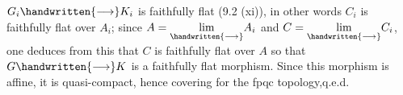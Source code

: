 
$G_i\handwritten{\longrightarrow}K_i$ is faithfully flat (9.2 (xi)), in other words $C_i$ is faithfully flat over $A_i$; since $A=\underset{\handwritten{\longrightarrow}}{\lim}A_i$ and $C=\underset{\handwritten{\longrightarrow}}{\lim}C_i$, one deduces from this that $C$ is faithfully flat over $A$\handwritten{,} so that $G\handwritten{\longrightarrow}K$ is a faithfully flat morphism. Since this morphism is affine, it is quasi-compact, hence covering for the fpqc topology,q.e.d.

